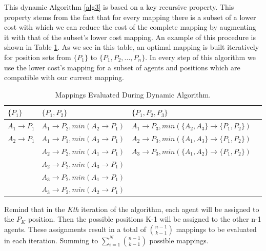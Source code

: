 This dynamic Algorithm \ref{alg3} is based on a key recursive property. This property stems from the fact that for every mapping there is a subset of a lower cost with which we can reduce the cost of the complete mapping by augmenting it with that of the subset's lower cost mapping. An example of this procedure is shown in Table \ref{tab:DynamicTable}. As we see in this table, an optimal mapping is built iteratively for position sets from $\lbrace P_{1} \rbrace$ to $\lbrace P_{1},P_{2},...,P_{n} \rbrace$. In every step of this algorithm we use the lower cost's mapping for a subset of agents and positions which are compatible with our current mapping.
\begin{table}[htb!]
\label{tab:DynamicTable}
\centering
    \begin{tabular}{ | l | l | l | p{5cm} |}
    \hline
    $\lbrace P_{1} \rbrace$   & $\lbrace P_{1},P_{2} \rbrace$ 	& $\lbrace P_{1},P_{2},P_{3} \rbrace$\\ \hline
    $A_{1} \rightarrow P_{1}$ & $A_{1} \rightarrow P_{2},min(A_{2} \rightarrow P_{1})$	 	& $A_{1} \rightarrow P_{3},min(\lbrace A_{2},A_{3} \rbrace \rightarrow \lbrace P_{1},P_{2} \rbrace)$  \\ \hline
    $A_{2} \rightarrow P_{1}$ & $A_{1} \rightarrow P_{1},min(A_{3} \rightarrow P_{1})$	 	& $A_{2} \rightarrow P_{3},min(\lbrace A_{1},A_{3} \rbrace \rightarrow \lbrace P_{1},P_{2} \rbrace)$  \\ \hline
     						  & $A_{2} \rightarrow P_{2},min(A_{1} \rightarrow P_{1})$ 		& $A_{3} \rightarrow P_{3},min(\lbrace A_{1},A_{2} \rbrace \rightarrow \lbrace P_{1},P_{2} \rbrace)$  \\ \hline
       						  & $A_{2} \rightarrow P_{2},min(A_{3} \rightarrow P_{1})$ 		&   \\ \hline
       						  & $A_{3} \rightarrow P_{2},min(A_{1} \rightarrow P_{1})$ 		&   \\ \hline
    						  & $A_{3} \rightarrow P_{2},min(A_{2} \rightarrow P_{1})$		&   \\
    \hline

    \end{tabular}
    
    \caption{Mappings Evaluated During Dynamic Algorithm. \cite{UtAustinVillaPaper}}    
\end{table}
Remind that in the \textit{Kth} iteration of the algorithm, each agent will be assigned to the $P_{K}$ position. Then the possible positions K-1 will be assigned to the other n-1 agents. These assignments result in a total of $ {{n-1}\choose{k-1}} $ mappings to be evaluated in each iteration. Summing to $\sum\limits_{i=1}^N{{n-1}\choose{k-1}}$ possible mappings.\\
